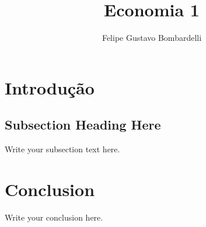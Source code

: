 \documentclass{article}
\begin{document}
\title{Economia 1}
\author{Felipe Gustavo Bombardelli}

\maketitle

\begin{abstract}

\end{abstract}

\section{Introdução}


\subsection{Subsection Heading Here}
Write your subsection text here.


\section{Conclusion}
Write your conclusion here.
\end{document}
